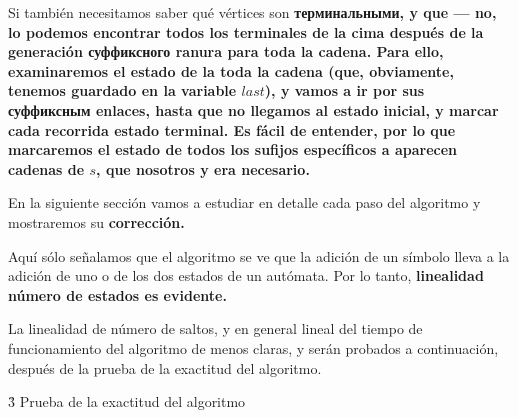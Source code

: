 Si también necesitamos saber qué vértices son \bf{терминальными}, y que --- no, lo podemos encontrar todos los terminales de la cima después de la generación суффиксного ranura para toda la cadena. Para ello, examinaremos el estado de la toda la cadena (que, obviamente, tenemos guardado en la variable $last$), y vamos a ir por sus суффиксным enlaces, hasta que no llegamos al estado inicial, y marcar cada recorrida estado terminal. Es fácil de entender, por lo que marcaremos el estado de todos los sufijos específicos a aparecen cadenas de $s$, que nosotros y era necesario.

En la siguiente sección vamos a estudiar en detalle cada paso del algoritmo y mostraremos su \bf{corrección}.

Aquí sólo señalamos que el algoritmo se ve que la adición de un símbolo lleva a la adición de uno o de los dos estados de un autómata. Por lo tanto, \bf{linealidad número de estados} es evidente.

La linealidad de número de saltos, y en general lineal del tiempo de funcionamiento del algoritmo de menos claras, y serán probados a continuación, después de la prueba de la exactitud del algoritmo.


\h3{ Prueba de la exactitud del algoritmo }

